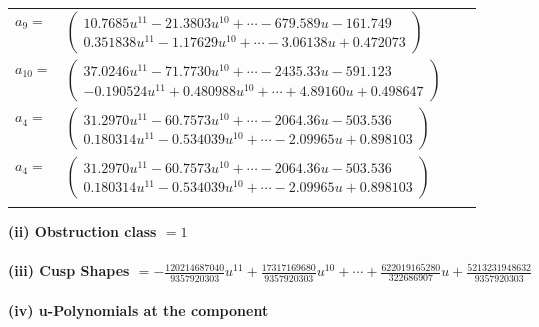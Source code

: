 \documentclass[1p]{elsarticle_modified}
\theoremstyle{definition}
\begin{document}
\begin{tabular}{m{7pt} m{180pt} m{7pt} m{180pt} }
\flushright $a_{9}=$&$\begin{pmatrix}10.7685 u^{11}-21.3803 u^{10}+\cdots-679.589 u-161.749\\0.351838 u^{11}-1.17629 u^{10}+\cdots-3.06138 u+0.472073\end{pmatrix}$ \\
\flushright $a_{10}=$&$\begin{pmatrix}37.0246 u^{11}-71.7730 u^{10}+\cdots-2435.33 u-591.123\\-0.190524 u^{11}+0.480988 u^{10}+\cdots+4.89160 u+0.498647\end{pmatrix}$ \\
\flushright $a_{4}=$&$\begin{pmatrix}31.2970 u^{11}-60.7573 u^{10}+\cdots-2064.36 u-503.536\\0.180314 u^{11}-0.534039 u^{10}+\cdots-2.09965 u+0.898103\end{pmatrix}$\\ \flushright $a_{4}=$&$\begin{pmatrix}31.2970 u^{11}-60.7573 u^{10}+\cdots-2064.36 u-503.536\\0.180314 u^{11}-0.534039 u^{10}+\cdots-2.09965 u+0.898103\end{pmatrix}$\\&\end{tabular}
\flushleft \textbf{(ii) Obstruction class $= 1$}\\~\\
\flushleft \textbf{(iii) Cusp Shapes $= -\frac{120214687040}{9357920303} u^{11}+\frac{17317169680}{9357920303} u^{10}+\cdots+\frac{622019165280}{322686907} u+\frac{5213231948632}{9357920303}$}\\~\\
\newpage\renewcommand{\arraystretch}{1}
\flushleft \textbf{(iv) u-Polynomials at the component}\newline \\
\end{document}
